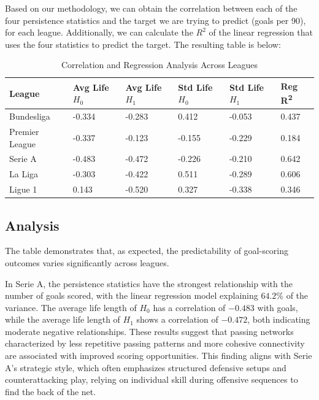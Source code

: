 \documentclass[10pt,twocolumn]{article}
\begin{document}
Based on our methodology, we can obtain the correlation between each of the four persistence statistics and the target we are trying to predict (goals per 90), for each league. Additionally, we can calculate the $ R^2 $ of the linear regression that uses the four statistics to predict the target. The resulting table is below:

\begin{table}[H]
\centering
\renewcommand{\arraystretch}{1.3} %

\scriptsize %
\begin{tabular}{|p{1.2cm}|p{0.8cm}|p{0.8cm}|p{0.8cm}|p{0.8cm}|p{0.8cm}|}

\hline
\textbf{League} & \textbf{Avg Life $ H_0 $} & \textbf{Avg Life $ H_1 $} & \textbf{Std Life $ H_0 $} & \textbf{Std Life $ H_1 $} & \textbf{Reg R\textsuperscript{2}} \\ \hline
Bundesliga      & -0.334          & -0.283          & 0.412           & -0.053         & 0.437         \\ \hline
Premier League            & -0.337          & -0.123          & -0.155          & -0.229          & 0.184         \\ \hline
Serie A         & -0.483          & -0.472          & -0.226          & -0.210         & 0.642        \\ \hline
La Liga         & -0.303          & -0.422         & 0.511           & -0.289         & 0.606        \\ \hline
Ligue 1         & 0.143           & -0.520         & 0.327           & -0.338         & 0.346        \\ \hline
\end{tabular}
\caption{Correlation and Regression Analysis Across Leagues}
\label{tab:league_analysis}
\end{table}

\subsection*{Analysis}
The table demonstrates that, as expected, the predictability of goal-scoring outcomes varies significantly across leagues. 

In Serie A, the persistence statistics have the strongest relationship with the number of goals scored, with the linear regression model explaining $64.2\%$ of the variance. The average life length of $ H_0 $ has a correlation of $-0.483$ with goals, while the average life length of $ H_1 $ shows a correlation of $-0.472$, both indicating moderate negative relationships. These results suggest that passing networks characterized by less repetitive passing patterns and more cohesive connectivity are associated with improved scoring opportunities. This finding aligns with Serie A’s strategic style, which often emphasizes structured defensive setups and counterattacking play, relying on individual skill during offensive sequences to find the back of the net.
\end{document}
